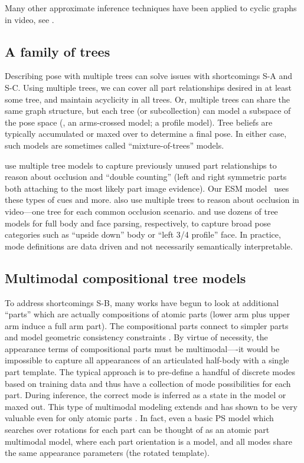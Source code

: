 Many other approximate inference techniques have been applied to cyclic graphs 
in video, see .

\subsection{A family of trees}\label{sec:tree-fam}
Describing pose with multiple trees can solve issues with shortcomings S-A and 
S-C.   Using multiple trees, we can cover all part relationships desired in at 
least some tree, and maintain acyclicity in all trees.  Or, multiple trees can 
share the same graph structure, but each tree (or subcollection) can model a 
subspace of the pose space (\eg, an arms-crossed model; a profile model). Tree 
beliefs are typically accumulated or maxed over to determine a final pose.  In 
either case, such models are sometimes called ``mixture-of-trees'' models.
  
\citet{wang2008multiple} use multiple tree models to capture previously unused 
part relationships to reason about occlusion and ``double counting'' (left and 
right symmetric parts both attaching to the most likely part image evidence).  
Our ESM model~ uses these types of cues and more.  
\citet{ioffe2001} also use multiple trees to reason about occlusion in 
video---one tree for each common occlusion scenario.  \citet{everingham2011} 
and \citet{ramanan-faces} use dozens of tree models for full body and face 
parsing, respectively, to capture broad pose categories such as ``upside down'' 
body or ``left 3/4 profile'' face.  In practice, mode definitions are data 
driven and not necessarily semantically interpretable.

\subsection{Multimodal compositional tree models}
To address shortcomings S-B, many works have begun to look at additional 
``parts'' which are actually compositions of atomic parts (\eg lower arm plus 
upper arm induce a full arm part).  The compositional parts connect to simpler 
parts and model geometric consistency constraints 
\citep{wang2011,sun2011,deva2011}.  By virtue of necessity, the appearance 
terms of compositional parts must be multimodal----it would be impossible to 
capture all appearances of an articulated half-body with a single part 
template.  The typical approach is to pre-define a handful of discrete modes 
based on training data and thus have a collection of mode possibilities for 
each part. During inference, the correct mode is inferred as a state in the 
model or maxed out.  This type of multimodal modeling extends and has shown to 
be very valuable even for only atomic parts \citep{deva2011}.  In fact, even a 
basic PS model which searches over rotations for each part can be thought of as 
an atomic part multimodal model, where each part orientation is a model, and 
all modes share the same appearance parameters (the rotated template).

